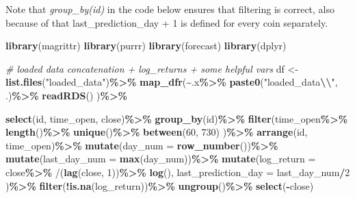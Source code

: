 \documentclass[
]{article}
\newenvironment{Shaded}{\begin{snugshade}}{\end{snugshade}}
\newcommand{\AttributeTok}[1]{\textcolor[rgb]{0.13,0.29,0.53}{#1}}
\newcommand{\CommentTok}[1]{\textcolor[rgb]{0.56,0.35,0.01}{\textit{#1}}}
\newcommand{\DecValTok}[1]{\textcolor[rgb]{0.00,0.00,0.81}{#1}}
\newcommand{\FunctionTok}[1]{\textcolor[rgb]{0.13,0.29,0.53}{\textbf{#1}}}
\newcommand{\NormalTok}[1]{#1}
\newcommand{\OtherTok}[1]{\textcolor[rgb]{0.56,0.35,0.01}{#1}}
\newcommand{\SpecialCharTok}[1]{\textcolor[rgb]{0.81,0.36,0.00}{\textbf{#1}}}
\newcommand{\StringTok}[1]{\textcolor[rgb]{0.31,0.60,0.02}{#1}}
\begin{document}
Note that \emph{group\_by(id)} in the code below ensures that filtering
is correct, also because of that last\_prediction\_day + 1 is defined
for every coin separately.

\begin{Shaded}
\begin{Highlighting}[]
\FunctionTok{library}\NormalTok{(magrittr)}
\FunctionTok{library}\NormalTok{(purrr)}
\FunctionTok{library}\NormalTok{(forecast)}
\FunctionTok{library}\NormalTok{(dplyr)}

\CommentTok{\# loaded data concatenation + log\_returns + some helpful vars}
\NormalTok{df }\OtherTok{\textless{}{-}} 
  \FunctionTok{list.files}\NormalTok{(}\StringTok{"loaded\_data"}\NormalTok{)}\SpecialCharTok{\%\textgreater{}\%}
    \FunctionTok{map\_dfr}\NormalTok{(}\SpecialCharTok{\textasciitilde{}}\NormalTok{.x}\SpecialCharTok{\%\textgreater{}\%}
              \FunctionTok{paste0}\NormalTok{(}\StringTok{"loaded\_data}\SpecialCharTok{\textbackslash{}\textbackslash{}}\StringTok{"}\NormalTok{, .)}\SpecialCharTok{\%\textgreater{}\%}
              \FunctionTok{readRDS}\NormalTok{()}
\NormalTok{    )}\SpecialCharTok{\%\textgreater{}\%}
  
  \FunctionTok{select}\NormalTok{(id, time\_open, close)}\SpecialCharTok{\%\textgreater{}\%}
  \FunctionTok{group\_by}\NormalTok{(id)}\SpecialCharTok{\%\textgreater{}\%}
  \FunctionTok{filter}\NormalTok{(time\_open}\SpecialCharTok{\%\textgreater{}\%}
          \FunctionTok{length}\NormalTok{()}\SpecialCharTok{\%\textgreater{}\%}
          \FunctionTok{unique}\NormalTok{()}\SpecialCharTok{\%\textgreater{}\%}
          \FunctionTok{between}\NormalTok{(}\DecValTok{60}\NormalTok{, }\DecValTok{730}\NormalTok{)}
\NormalTok{  )}\SpecialCharTok{\%\textgreater{}\%}
  \FunctionTok{arrange}\NormalTok{(id, time\_open)}\SpecialCharTok{\%\textgreater{}\%}
  \FunctionTok{mutate}\NormalTok{(}\AttributeTok{day\_num =} \FunctionTok{row\_number}\NormalTok{())}\SpecialCharTok{\%\textgreater{}\%}
  \FunctionTok{mutate}\NormalTok{(}\AttributeTok{last\_day\_num =} \FunctionTok{max}\NormalTok{(day\_num))}\SpecialCharTok{\%\textgreater{}\%}
  \FunctionTok{mutate}\NormalTok{(}\AttributeTok{log\_return =}\NormalTok{ close}\SpecialCharTok{\%\textgreater{}\%}
                        \StringTok{\textasciigrave{}}\AttributeTok{/}\StringTok{\textasciigrave{}}\NormalTok{(}\FunctionTok{lag}\NormalTok{(close, }\DecValTok{1}\NormalTok{))}\SpecialCharTok{\%\textgreater{}\%} 
                        \FunctionTok{log}\NormalTok{(),}
         \AttributeTok{last\_prediction\_day =}\NormalTok{ last\_day\_num}\SpecialCharTok{/}\DecValTok{2}
\NormalTok{  )}\SpecialCharTok{\%\textgreater{}\%}
  \FunctionTok{filter}\NormalTok{(}\SpecialCharTok{!}\FunctionTok{is.na}\NormalTok{(log\_return))}\SpecialCharTok{\%\textgreater{}\%}
  \FunctionTok{ungroup}\NormalTok{()}\SpecialCharTok{\%\textgreater{}\%}
  \FunctionTok{select}\NormalTok{(}\SpecialCharTok{{-}}\NormalTok{close)}
\end{Highlighting}
\end{Shaded}
\end{document}
